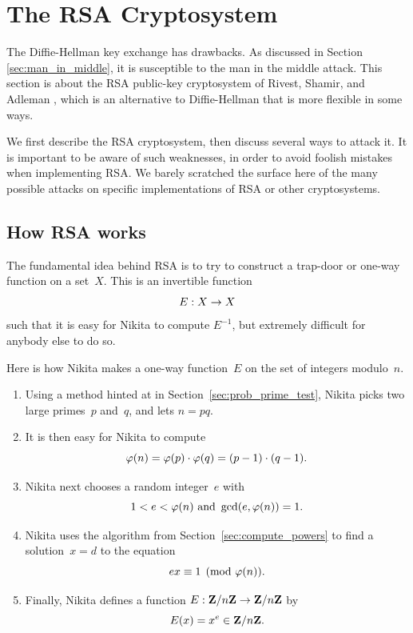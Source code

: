 \section{The RSA Cryptosystem}
\label{sec:RSA}\label{sec:rsa}

The Diffie-Hellman key exchange has drawbacks.  As discussed in
Section \ref{sec:man_in_middle}, it is susceptible to the man in the
middle attack. This section is about the RSA public-key cryptosystem of
Rivest, Shamir, and Adleman \cite{rsa:origin}, which is an alternative
to Diffie-Hellman that is more flexible in some ways.

We first describe the RSA cryptosystem, then discuss several ways to
attack it.  It is important to be aware of such weaknesses, in order
to avoid foolish mistakes when implementing RSA.  We barely scratched
the surface here of the many possible attacks on specific
implementations of RSA or other cryptosystems.

\subsection{How RSA works}
The fundamental idea behind RSA is to try to construct
a trap-door or one-way function on a set~$X$.
This is an invertible function
$$
     E : X \rightarrow X
$$
such that it is easy for Nikita to compute $E^{-1}$, but extremely
difficult for anybody else to do so.



Here is how Nikita makes a one-way function~$E$
on the set of integers modulo~$n$.
\begin{enumerate}
\item Using a method hinted at in Section~\ref{sec:prob_prime_test},
Nikita picks two large primes~$p$ and~$q$, and lets $n=pq$.
\item It is then easy for Nikita to compute
$$
   \varphi(n) = \varphi(p)\cdot \varphi(q) = (p-1)\cdot (q-1).
$$
\item Nikita next chooses a random integer~$e$ with
 $$
 1<e<\varphi(n)\text{ and } \gcd(e,\varphi(n))=1.
 $$

\item Nikita uses the algorithm from Section~\ref{sec:compute_powers}
to find a solution~$x=d$ to the equation
$$
   ex \equiv 1\pmod{\varphi(n)}.
$$

\item Finally, Nikita defines a function $E:\mathbf{Z}/n\mathbf{Z}{} \rightarrow \mathbf{Z}/n\mathbf{Z}{}$ by
$$
   E(x) = x^e \in \mathbf{Z}/n\mathbf{Z}{}.
$$
\end{enumerate}

